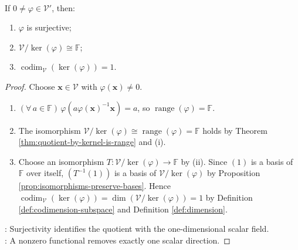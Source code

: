\begin{corollary} \label{cor:nonzero-functional-hyperplane-kernel} \\
If $0\neq\varphi\in\mathcal{V}'$, then:
\begin{enumerate}[label=(\roman*)]
\setlength{\itemsep}{0pt}
\item $\varphi$ is surjective;
\item $\mathcal{V}/\ker(\varphi)\cong\mathbb{F}$;
\item $\operatorname{codim}_{\mathcal{V}}(\ker(\varphi))=1$.
\end{enumerate}
\begin{proof}
Choose $\mathbf{x}\in\mathcal{V}$ with $\varphi(\mathbf{x})\neq0$.
\begin{enumerate}[label=(\roman*)]
\setlength{\itemsep}{0pt}
\item $(\forall\,a\in\mathbb{F})\,\varphi(a\varphi(\mathbf{x})^{-1}\mathbf{x})=a$, so $\operatorname{range}(\varphi)=\mathbb{F}$.
\item The isomorphism $\mathcal{V}/\ker(\varphi)\cong\operatorname{range}(\varphi)=\mathbb{F}$ holds by Theorem \ref{thm:quotient-by-kernel-is-range} and (i).
\item Choose an isomorphism $T:\mathcal{V}/\ker(\varphi)\to\mathbb{F}$ by (ii). Since $(1)$ is a basis of $\mathbb{F}$ over itself, $(T^{-1}(1))$ is a basis of $\mathcal{V}/\ker(\varphi)$ by Proposition \ref{prop:isomorphisms-preserve-bases}. Hence $\operatorname{codim}_{\mathcal{V}}(\ker(\varphi))=\dim(\mathcal{V}/\ker(\varphi))=1$ by Definition \ref{def:codimension-subspace} and Definition \ref{def:dimension}.
\end{enumerate}
: Surjectivity identifies the quotient with the one-dimensional scalar field.\\
: A nonzero functional removes exactly one scalar direction.
\end{proof}
\end{corollary}
